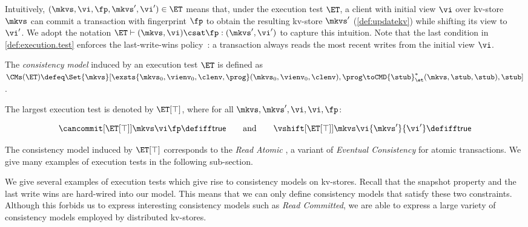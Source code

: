 Intuitively, \((\mkvs, \vi, \fp, \mkvs', \vi') \in \ET\) means that, under the execution test \(\ET\),
a client with initial view \(\vi\) over kv-store \(\mkvs\) can commit a transaction with 
fingerprint \(\fp\) to obtain the resulting kv-store \(\mkvs'\) (\cref{def:updatekv}) while shifting its view
to \(\vi'\). We adopt the notation \(\ET \vdash (\mkvs, \vi) \csat \fp: (\mkvs', \vi')\) to capture this intuition. 
Note that the last condition in \cref{def:execution.test} enforces the last-write-wins
policy~\cite{vogels:2009:ec:1435417.1435432}: 
a transaction always reads the most recent writes from the initial view \(\vi\).  

\SpaceAboveDef
\begin{definition}
\label{def:cm}
The \emph{consistency model} induced by an execution test \(\ET\) is defined as 
\(
\CMs(\ET) \defeq 
\Set{\mkvs}[ 
\exsts{\mkvs_0,\vienv_0,\clenv,\prog}
(\mkvs_0,\vienv_0,\clenv),\prog \toCMD{\stub}_{\et}^{*} (\mkvs, \stub, \stub),\stub
]
\).
\end{definition}
\SpaceBelowDef

The largest execution test is denoted by \(\ET[\top]\), where for all \(\mkvs, \mkvs', \vi, \vi, \fp\):%

\SpaceAboveMath
\[
	\cancommit[{\ET[\top]}] \mkvs \vi \fp \defiff \mathsf{true}
	\qquad  \text{and} \qquad 
	\vshift[{\ET[\top]}] \mkvs \vi {\mkvs'} {\vi'} \defiff \mathsf{true}
\]%
\SpaceBelowMath

The consistency model induced by \(\ET[\top]\) 
corresponds to the \emph{Read Atomic} \cite{ramp}, a variant of \emph{Eventual 
Consistency} \cite{ev_transactions} for atomic transactions. 
We give many examples of execution tests in the following sub-section. 



\label{subsec:cm_examples}
We give several examples of execution tests which give rise to consistency
models on kv-stores.
Recall that the snapshot property and the last write wins are hard-wired into our model. 
This means that we can only define  consistency models that satisfy these two constraints. 
Although this forbids us to express interesting consistency models such as \emph{Read Committed}, we are able to express a large variety of consistency models employed by distributed kv-stores.


